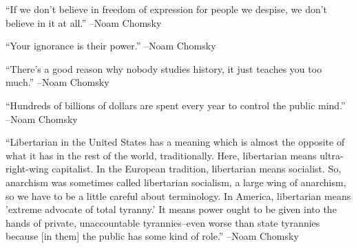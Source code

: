 \documentclass{article}%
\begin{document}
\linebreak%
\vspace{1mm}%
\begin{minipage}{\textwidth}%
\flushleft%
“If we don't believe in freedom of expression for people we despise, we don't believe in it at all.”%
\linebreak%
\vspace{1mm}%
–Noam Chomsky%
\linebreak%
\vspace{1mm}%
\end{minipage}%
\linebreak%
\vspace{1mm}%
\begin{minipage}{\textwidth}%
\flushleft%
“Your ignorance is their power.”%
\linebreak%
\vspace{1mm}%
–Noam Chomsky%
\linebreak%
\vspace{1mm}%
\end{minipage}%
\linebreak%
\vspace{1mm}%
\begin{minipage}{\textwidth}%
\flushleft%
“There's a good reason why nobody studies history, it just teaches you too much.”%
\linebreak%
\vspace{1mm}%
–Noam Chomsky%
\linebreak%
\vspace{1mm}%
\end{minipage}%
\linebreak%
\vspace{1mm}%
\begin{minipage}{\textwidth}%
\flushleft%
“Hundreds of billions of dollars are spent every year to control the public mind.”%
\linebreak%
\vspace{1mm}%
–Noam Chomsky%
\linebreak%
\vspace{1mm}%
\end{minipage}%
\linebreak%
\vspace{1mm}%
\begin{minipage}{\textwidth}%
\flushleft%
“Libertarian in the United States has a meaning which is almost the opposite of what it has in the rest of the world, traditionally. Here, libertarian means  ultra{-}right{-}wing capitalist. In the European tradition, libertarian means socialist.  So, anarchism was sometimes called libertarian socialism, a large wing of anarchism,  so we have to be a little careful about terminology. In America, libertarian means  'extreme advocate of total tyranny.' It means power ought to be given into the hands  of private, unaccountable tyrannies–even worse than state tyrannies because {[}in them{]} the public has some kind of role.”%
\linebreak%
\vspace{1mm}%
–Noam Chomsky%
\linebreak%
\vspace{1mm}%
\end{minipage}%
\end{document}
